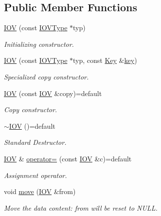 \subsection*{Public Member Functions}
\begin{DoxyCompactItemize}
\item 
\hyperlink{class_d_d4hep_1_1_i_o_v_a0a32eb684174feeec7047c7fe4d351cb}{I\+OV} (const \hyperlink{class_d_d4hep_1_1_i_o_v_type}{I\+O\+V\+Type} $\ast$typ)
\begin{DoxyCompactList}\small\item\em Initializing constructor. \end{DoxyCompactList}\item 
\hyperlink{class_d_d4hep_1_1_i_o_v_a1744cedccf7a479d152c842f7fc5220a}{I\+OV} (const \hyperlink{class_d_d4hep_1_1_i_o_v_type}{I\+O\+V\+Type} $\ast$typ, const \hyperlink{class_d_d4hep_1_1_i_o_v_a07cb46dc875296dc9cccf4ff370104ae}{Key} \&\hyperlink{class_d_d4hep_1_1_i_o_v_a314b969532607ee37e1f3ac27e4e6f58}{key})
\begin{DoxyCompactList}\small\item\em Specialized copy constructor. \end{DoxyCompactList}\item 
\hyperlink{class_d_d4hep_1_1_i_o_v_ac90079056c51c0ae5e7f88bc4050b31d}{I\+OV} (const \hyperlink{class_d_d4hep_1_1_i_o_v}{I\+OV} \&copy)=default
\begin{DoxyCompactList}\small\item\em Copy constructor. \end{DoxyCompactList}\item 
\hyperlink{class_d_d4hep_1_1_i_o_v_a16d2f34c37ff41d41fcefa6a04efad58}{$\sim$\+I\+OV} ()=default
\begin{DoxyCompactList}\small\item\em Standard Destructor. \end{DoxyCompactList}\item 
\hyperlink{class_d_d4hep_1_1_i_o_v}{I\+OV} \& \hyperlink{class_d_d4hep_1_1_i_o_v_a6a4245dda841fc7b529fe2163599f59d}{operator=} (const \hyperlink{class_d_d4hep_1_1_i_o_v}{I\+OV} \&c)=default
\begin{DoxyCompactList}\small\item\em Assignment operator. \end{DoxyCompactList}\item 
void \hyperlink{class_d_d4hep_1_1_i_o_v_aa473ed270d7b0e3930b2654406233a3c}{move} (\hyperlink{class_d_d4hep_1_1_i_o_v}{I\+OV} \&from)
\begin{DoxyCompactList}\small\item\em Move the data content\+: \textquotesingle{}from\textquotesingle{} will be reset to N\+U\+LL. \end{DoxyCompactList}\item 

\end{DoxyCompactItemize}
